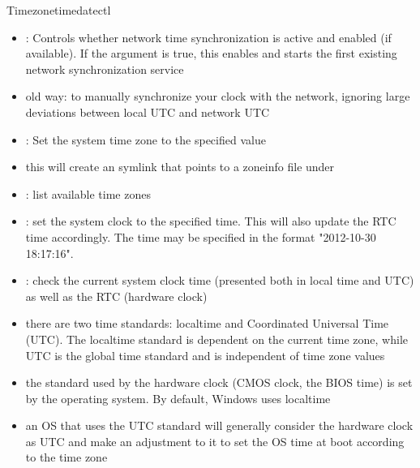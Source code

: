 \begin{frame}{Timezone}{timedatectl\vspace{0.5cm}}
  \begin{itemize}
    \item {}: Controls whether network time synchronization is active and enabled (if available). If the argument is true, this enables and starts the first existing network synchronization service
    \item \alert{old way:}  to manually synchronize your clock with the network, ignoring large deviations between local UTC and network UTC
    \item  {}: Set the system time zone to the specified value
      \item this will create an  symlink that points to a zoneinfo file under 
    \item {}: list available time zones
    \item {}: set the system clock to the specified time. This will also update the RTC time accordingly. The time may be specified in the format "2012-10-30 18:17:16".
    \item {}: check the current \alert{system clock} time (presented both in local time and UTC) as well as the RTC (\alert{hardware clock})
    \item there are two time standards: localtime and Coordinated Universal Time (UTC). The localtime standard is dependent on the current time zone, while UTC is the global time standard and is independent of time zone values
    \item the standard used by the hardware clock (CMOS clock, the BIOS time) is set by the operating system. By default, Windows uses localtime
    \item an OS that uses the UTC standard will generally consider the hardware clock as UTC and make an adjustment to it to set the OS time at boot according to the time zone
  \end{itemize}
\end{frame}

